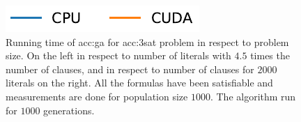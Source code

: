 \begin{figure}[ht!]
    \begin{minipage}[t]{0.15\textwidth}
        \includegraphics[width=\textwidth]{img/runs/time_ga_clausecount_legend.pdf}
    \end{minipage}

    \caption[Running time of Genetic Algorithm in respect to problem size]{Running time of \acrlong{acc:ga} for \acrshort{acc:3sat} problem in respect to problem size. On the left in respect to number of literals with $4.5$ times the number of clauses, and in respect to number of clauses for $2000$ literals on the right. All the formulas have been satisfiable and measurements are done for population size $1000$. The algorithm run for $1000$ generations.}
    \label{meas:garuntimeproblemsize}
\end{figure}

